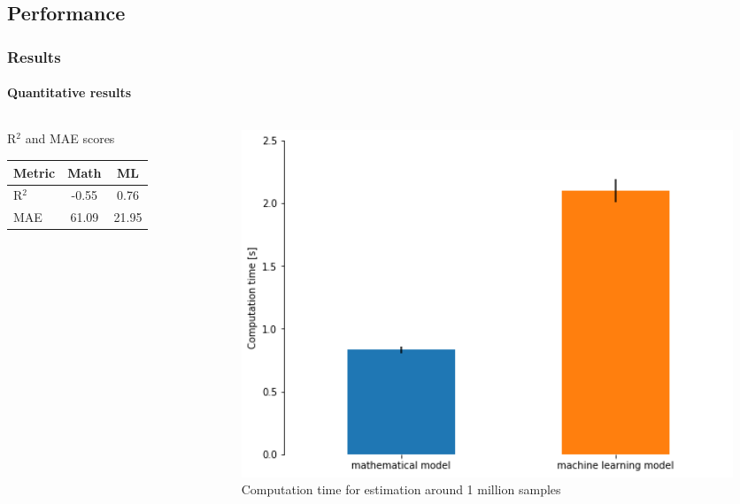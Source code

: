 \documentclass{beamer}
\begin{document}
\subsection{Performance}

\begin{frame}
  \frametitle{Results}
  \framesubtitle{Quantitative results}
  \begin{columns}
    \begin{column}{0.5\textwidth}
      \begin{block}{\small R$^2$ and MAE scores}
        \begin{table}
          \scriptsize
          \centering
          \begin{tabular}{lcc}
            \toprule
            \textbf{Metric} & \textbf{Math} & \textbf{ML} \\
            \midrule
            R$^2$ & -0.55 & 0.76 \\
            MAE & 61.09 & 21.95 \\
            \bottomrule
          \end{tabular}
        \end{table}
      \end{block}
    \end{column}
    \begin{column}{0.5\textwidth}  %
      \begin{figure}
        \includegraphics[width=1.0\textwidth]{./images/scoring_time.png}
        \caption{Computation time for estimation around 1 million samples}
      \end{figure}
    \end{column}
  \end{columns}
\end{frame}
\end{document}

